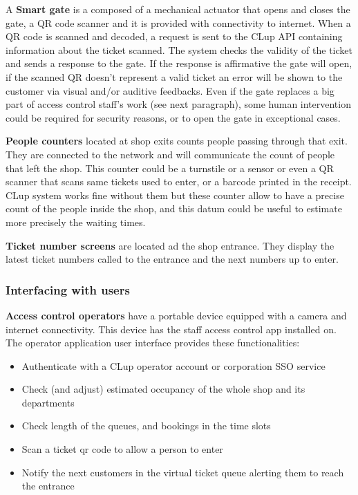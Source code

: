 A \textbf{Smart gate} is a composed of a mechanical actuator that opens and closes the gate, a QR code scanner and it is provided with connectivity to internet. When a QR code is scanned and decoded, a request is sent to the CLup API containing information about the ticket scanned.
The system checks the validity of the ticket and sends a response to the gate. If the response is affirmative the gate will open, if the scanned QR doesn't represent a valid ticket an error will be shown to the customer via visual and/or auditive feedbacks. Even if the gate replaces a big part of access control staff's work (see next paragraph), some human intervention could be required for security reasons, or to open the gate in exceptional cases.


\textbf{People counters} located at shop exits counts people passing through that exit. They are connected to the network and will communicate the count of people that left the shop. This counter could be a turnstile or a sensor or even a QR scanner that scans same tickets used to enter, or a barcode printed in the receipt. CLup system works fine without them but these counter allow to have a precise count of the people inside the shop, and this datum could be useful to estimate more precisely the waiting times.

\textbf{Ticket number screens} are located ad the shop entrance. They display the latest ticket numbers called to the entrance and the next numbers up to enter.

\subsubsection{Interfacing with users}

\textbf{Access control operators} have a portable device equipped with a camera and internet connectivity. This device has the staff access control app installed on. The operator application user interface provides these functionalities:
\begin{itemize}
    \item Authenticate with a CLup operator account or corporation SSO service
    \item Check (and adjust) estimated occupancy of the whole shop and its departments
    \item Check length of the queues, and bookings in the time slots
    \item Scan a ticket qr code to allow a person to enter
    \item Notify the next customers in the virtual ticket queue alerting them to reach the entrance
\end{itemize}

